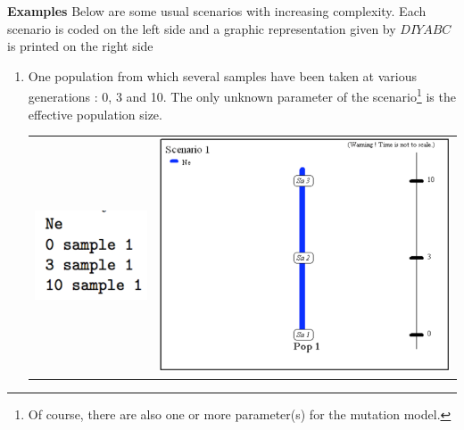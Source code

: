\textbf{Examples} Below are some usual scenarios with increasing complexity. Each scenario is coded on the left side and a graphic representation given by $DIYABC$ is printed on the right side
\begin{enumerate}
\item One population from which several samples have been taken at
various generations : 0, 3 and 10. The only unknown parameter of the scenario\footnote{Of course, there are also one or more parameter(s) for the mutation model.} is the
 effective population size. \\
\begin{center} 
\begin{tabular}{cc}
\includegraphics[scale=0.5]{code_scenario_01.pdf} & \includegraphics[scale=0.35]{scenario_01.pdf} \\
\end{tabular}
\end{center}


\end{enumerate}

